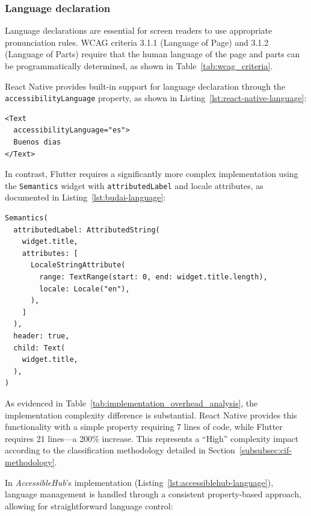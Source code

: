 \subsubsection{Language declaration}
\label{subsubsec:language-declaration}

Language declarations are essential for screen readers to use appropriate pronunciation rules. WCAG criteria 3.1.1 (Language of Page) and 3.1.2 (Language of Parts) require that the human language of the page and parts can be programmatically determined, as shown in Table~\ref{tab:wcag_criteria}.

React Native provides built-in support for language declaration through the \\\texttt{accessibilityLanguage} property, as shown in Listing~\ref{lst:react-native-language}:

\begin{lstlisting}[style=ReactNativeStyle, caption=Language declaration in React Native, label=lst:react-native-language]
<Text
  accessibilityLanguage="es">
  Buenos dias
</Text>
\end{lstlisting}

In contrast, Flutter requires a significantly more complex implementation using the \texttt{Semantics} widget with \texttt{attributedLabel} and locale attributes, as documented in Listing~\ref{lst:budai-language}:

\begin{lstlisting}[style=DartStyle, caption=Language implementation in Budai's code, label=lst:budai-language]
Semantics(
  attributedLabel: AttributedString(
    widget.title,
    attributes: [
      LocaleStringAttribute(
        range: TextRange(start: 0, end: widget.title.length),
        locale: Locale("en"),
      ),
    ]
  ),
  header: true,
  child: Text(
    widget.title,
  ),
)
\end{lstlisting}

As evidenced in Table~\ref{tab:implementation_overhead_analysis}, the implementation complexity difference is substantial. React Native provides this functionality with a simple property requiring 7 lines of code, while Flutter requires 21 lines—a 200\% increase. This represents a ``High'' complexity impact according to the classification methodology detailed in Section~\ref{subsubsec:cif-methodology}.

In \textit{AccessibleHub}'s implementation (Listing~\ref{lst:accessiblehub-language}), language management is handled through a consistent property-based approach, allowing for straightforward language control:

